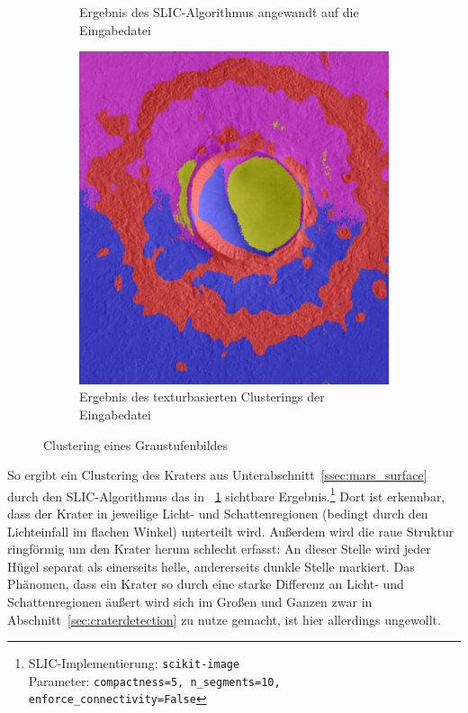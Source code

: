 \begin{figure}[h!]
\begin{subfigure}[t]{0.32\textwidth}
		\captionsetup{format=plain,width=0.85\textwidth}
		\caption{Ergebnis des SLIC-Algorithmus angewandt auf die Eingabedatei}
		\label{fig:slic_vs_tsugf_slic}
	\end{subfigure}
	\hfill
	\begin{subfigure}[t]{0.32\textwidth}
		\centering
		\includegraphics[width=\textwidth,keepaspectratio]{images/gen/slic_vs_tsugf/Gre13_01.jpg_tsugf.png}
		\captionsetup{format=plain,width=0.85\textwidth}
		\caption{Ergebnis des texturbasierten Clusterings der Eingabedatei}
		\label{fig:slic_vs_tsugf_tsugf}
	\end{subfigure}
	\caption{Clustering eines Graustufenbildes}
\end{figure}

So ergibt ein Clustering des Kraters aus Unterabschnitt~\ref{ssec:mars_surface} durch den SLIC-Algorithmus \cite{achanta_10} das in \figurename~\ref{fig:slic_vs_tsugf_slic} sichtbare Ergebnis.\footnote{SLIC-Implementierung: \texttt{scikit-image}\\Parameter: \texttt{compactness=5, n\_segments=10, enforce\_connectivity=False}} Dort ist erkennbar, dass der Krater in jeweilige Licht- und Schattenregionen (bedingt durch den Lichteinfall im flachen Winkel) unterteilt wird. Außerdem wird die raue Struktur ringförmig um den Krater herum schlecht erfasst: An dieser Stelle wird jeder Hügel separat als einerseits helle, andererseits dunkle Stelle markiert. Das Phänomen, dass ein Krater so durch eine starke Differenz an Licht- und Schattenregionen äußert wird sich im Großen und Ganzen zwar in Abschnitt~\ref{sec:craterdetection} zu nutze gemacht, ist hier allerdings ungewollt.

